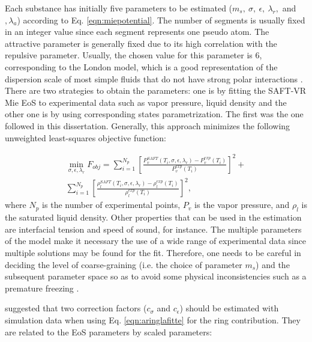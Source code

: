 Each substance has initially five parameters to be estimated ($m_s,\ \sigma,\ \epsilon,\ \lambda_{r},$ and $, \lambda_{a}$) according to Eq. \eqref{eqn:miepotential}. The number of segments is usually fixed in an integer value since each segment represents one pseudo atom. The attractive parameter is generally  fixed due to its  high correlation with the repulsive parameter. Usually, the chosen value for this parameter is 6, corresponding to the London model, which is a good representation of the dispersion scale of most simple fluids that do not have strong polar interactions \cite{ramrattan2015,herdes2015}. There are two strategies to obtain the parameters: one is by fitting the SAFT-VR Mie EoS to experimental data such as vapor pressure, liquid density and the other one is by using corresponding states parametrization. The first was the one followed in this dissertation. Generally, this approach minimizes the following unweighted least-squares objective function:

\begin{equation}
\begin{aligned}
\min\limits_{\sigma,\epsilon,\lambda_{r}} F_{obj}= \sum_{i=1}^{N_{p}} \left[\frac{P_{v}^{SAFT}(T_{i},\sigma,\epsilon,\lambda_{r})-P_{v}^{exp}(T_{i})}{P_{v}^{exp}(T_{i})} \right]^2 +\\
\sum_{i=1}^{N_{p}} \left[\frac{\rho_{l}^{SAFT}(T_{i},\sigma,\epsilon,\lambda_{r})-\rho_{l}^{exp}(T_{i})}{\rho_{l}^{exp}(T_{i})} \right]^2 ,
\end{aligned}
\label{eqn:fobj}
\end{equation}
where $N_{p}$ is the number of experimental points, $P_{v}$ is the vapor pressure, and $\rho_{l}$ is the saturated liquid density. Other properties that can be used in the estimation are interfacial tension and speed of sound, for instance. The multiple parameters of the model make it necessary the use of a wide range of experimental data since multiple solutions may be found for the fit. Therefore, one needs to be careful in deciding the level of coarse-graining (i.e. the choice of parameter $m_{s}$) and the subsequent parameter space so as to avoid some physical inconsistencies such as a premature freezing \cite{lobanova2015}.

 suggested that two correction factors ($c_{\sigma}$ and $c_{\epsilon}$) should be estimated with simulation data when using Eq. \eqref{eqn:aringlafitte} for the ring contribution. They are related to the EoS parameters by scaled parameters:

